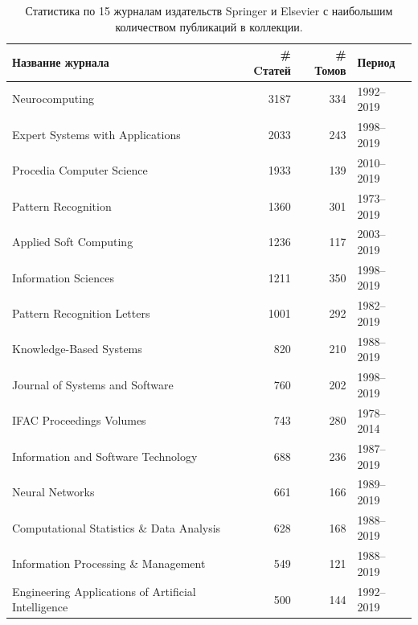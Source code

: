 \documentclass[12pt]{article}
\begin{document}
\begin{table}
	\def\arraystretch{0.9}
	\centering
	{\small
		\begin{tabular}{lrrl}
			\toprule
			Название журнала                                    &  \# Cтатей     & \# Томов & Период     \\
			\midrule
			Neurocomputing                                      &  3187 &  334 &  1992--2019 \\
			Expert Systems with Applications                    &  2033 &  243 &  1998--2019 \\
			Procedia Computer Science                           &  1933 &  139 &  2010--2019 \\
			Pattern Recognition                                 &  1360 &  301 &  1973--2019 \\
			Applied Soft Computing                              &  1236 &  117 &  2003--2019 \\
			Information Sciences                                &  1211 &  350 &  1998--2019 \\
			Pattern Recognition Letters                         &  1001 &  292 &  1982--2019 \\
			Knowledge-Based Systems                             &  820 &  210 &  1988--2019 \\
			Journal of Systems and Software                     &  760 &  202 &  1998--2019 \\
			IFAC Proceedings Volumes                            &  743 &  280 &  1978--2014 \\
			Information and Software Technology                 &  688 &  236 &  1987--2019 \\
			Neural Networks                                     &  661 &  166 &  1989--2019 \\
			Computational Statistics \& Data Analysis            &  628 &  168 &  1988--2019 \\
			Information Processing \& Management                 &  549 &  121 &  1988--2019 \\
			Engineering Applications of Artificial Intelligence &  500 &  144 &  1992--2019 \\
			\bottomrule
	\end{tabular}}
	\caption{Статистика по 15 журналам издательств Springer и Elsevier с наибольшим количеством публикаций в коллекции.}
	\label{table:papers}
\end{table}

\end{document}
